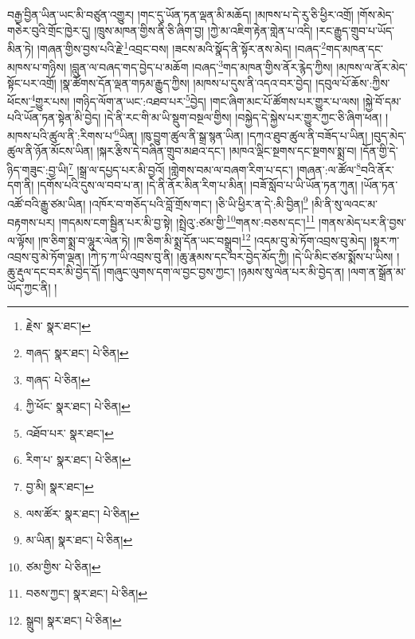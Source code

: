 བརྒྱ་བྱིན་ཡིན་ཡང་མི་བཙུན་འགྱུར། །གང་དུ་ཡོན་ཏན་ལྡན་མི་མཆོད། །མཁས་པ་དེ་རུ་ཅི་ཕྱིར་འགྲོ། །གོས་མེད་གཅེར་བུའི་གྲོང་ཁྱེར་དུ། །ཁྲུས་མཁན་གྱིས་ནི་ཅི་ཞིག་བྱ། །ཀྱེ་མ་འཇིག་རྟེན་གླེན་པ་འདི། །རང་རྒྱུད་གྲུབ་པ་ཡོད་མིན་ཏེ། །གཞན་གྱིས་བྱས་པའི་རྗེ་\footnote{རྗེས་  སྣར་ཐང་། }འབྲང་བས། །ཟངས་མའི་སྣོད་ནི་སྟོར་ནས་མེད། །བཞད་\footnote{གཞད་  སྣར་ཐང་།  པེ་ཅིན། }གད་མཁན་དང་མཁས་པ་གཉིས། །བླུན་ལ་བཞད་གད་བྱེད་པ་མཆོག །བཞད་\footnote{གཞད་  པེ་ཅིན། }གད་མཁན་གྱིས་ནོར་རྙེད་ཀྱིས། །མཁས་ལ་ནོར་མེད་སྟོང་པར་འགྲོ། །སྣ་ཚོགས་དོན་ལྡན་གཏམ་རྒྱུད་ཀྱིས། །མཁས་པ་དུས་ནི་འདའ་བར་བྱེད། །དབུལ་པོ་ཆོས་:ཀྱིས་ཕོངས་\footnote{ཀྱི་ཕོང་  སྣར་ཐང་།  པེ་ཅིན། }གྱུར་པས། །གཉིད་ལོག་ན་ཡང་:འཐབ་པར་\footnote{འཐོབ་པར་  སྣར་ཐང་། }བྱེད། །གང་ཞིག་མང་པོ་ཚོགས་པར་གྱུར་པ་ལས། །སྐྱེ་བོ་དམ་པའི་ཡོན་ཏན་སྟེན་མི་བྱེད། །དེ་ནི་རང་གི་མ་ཡི་སྡུག་བསྔལ་གྱིས། །བསྐྱེད་དེ་སྐྱེས་པར་གྱུར་ཀྱང་ཅི་ཞིག་ཕན། །མཁས་པའི་ཚུལ་ནི་:རིགས་པ་\footnote{རིག་པ་  སྣར་ཐང་།  པེ་ཅིན། }ཡིན། །ཁུ་བྱུག་ཚུལ་ནི་སྒྲ་སྙན་ཡིན། །དཀའ་ཐུབ་ཚུལ་ནི་བཟོད་པ་ཡིན། །བུད་མེད་ཚུལ་ནི་ཉོན་མོངས་ཡིན། །སྐར་རྩིས་དེ་བཞིན་གྲུབ་མཐའ་དང་། །མཁའ་ལྡིང་སྔགས་དང་སྔགས་སྨྲ་བ། །དོན་གྱི་དེ་ཉིད་གཟུང་:བྱ་ཡི།\footnote{བྱ་མི།  སྣར་ཐང་། } །སྒྲ་ལ་དཔྱད་པར་མི་བྱའོ། །གླེགས་བམ་ལ་བཞག་རིག་པ་དང་། །གཞན་:ལ་ཚོལ་\footnote{ལས་ཚོར་  སྣར་ཐང་།  པེ་ཅིན། }བའི་ནོར་དག་ནི། །དགོས་པའི་དུས་ལ་བབ་པ་ན། །དེ་ནི་ནོར་མིན་རིག་པ་མིན། །བཟོ་སློབ་པ་ཡི་ཡོན་ཏན་ཀུན། །ཡོན་ཏན་འཚོ་བའི་རྒྱུ་ཙམ་ཡིན། །འཁོར་བ་གཅོད་པའི་བློ་གྲོས་གང་། །ཅི་ཡི་ཕྱིར་ན་དེ་:མི་བྱིན།\footnote{མ་ཡིན།  སྣར་ཐང་།  པེ་ཅིན། } །མི་ནི་སུ་ལའང་མ་བརྟགས་པར། །གདམས་ངག་སྦྱིན་པར་མི་བྱ་སྟེ། །སྤྲེའུ་:ཙམ་གྱི་\footnote{ཙམ་གྱིས་  པེ་ཅིན། }གནས་:བཅས་དང་།\footnote{བཅས་ཀྱང་།  སྣར་ཐང་།  པེ་ཅིན། } །གནས་མེད་པར་ནི་བྱས་ལ་ལྟོས། །ཁ་ཅིག་སྨྲ་བ་ལྷུར་ལེན་ཏེ། །ཁ་ཅིག་མི་སྨྲ་དོན་ཡང་བསྒྲུབ།\footnote{སྒྲུབ།  སྣར་ཐང་།  པེ་ཅིན། } །འདམ་བུ་མེ་ཏོག་འབྲས་བུ་མེད། །སྟར་ཀ་འབྲས་བུ་མེ་ཏོག་ལྡན། །ཀེ་ཏ་ཀ་ཡི་འབྲས་བུ་ནི། །ཆུ་རྣམས་དང་བར་བྱེད་མོད་ཀྱི། །དེ་ཡི་མིང་ཙམ་སྨོས་པ་ཡིས། །ཆུ་རྡུལ་དང་བར་མི་བྱེད་དོ། །གཞུང་ལུགས་དག་ལ་བྱང་བྱས་ཀྱང་། །ཉམས་སུ་ལེན་པར་མི་བྱེད་ན། །ལག་ན་སྒྲོན་མ་ཡོད་ཀྱང་ནི། །
